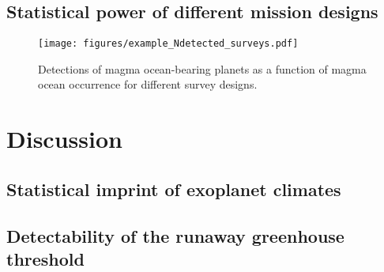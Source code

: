 \documentclass[modern]{aastex631}
\begin{document}
\subsection{Statistical power of different mission designs}\label{sec:statpower_missions}

\begin{figure}[ht!]
    \begin{centering}

        \texttt{[image: figures/example\_Ndetected\_surveys.pdf]}
        \caption{
        Detections of magma ocean-bearing planets as a function of magma ocean occurrence for different survey designs.
        }
        \label{fig:example_Ndetected_surveys}
    \end{centering}
\end{figure}


\section{Discussion}\label{sec:discussion}

\subsection{Statistical imprint of exoplanet climates}

\subsection{Detectability of the runaway greenhouse threshold}
\end{document}
